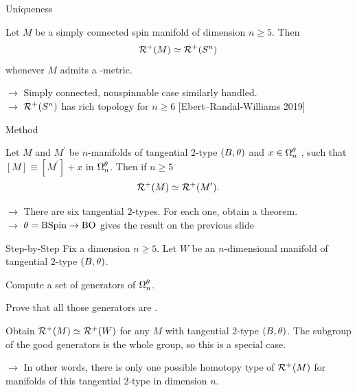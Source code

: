 \documentclass{presis}
\begin{document}
\begin{frame}{Uniqueness}
    \begin{thm}
        Let $M$ be a simply connected spin manifold of dimension $n\geq 5$. Then
        \begin{equation*}
            \mathcal{R}^+(M) \simeq \mathcal{R}^+(S^n)
        \end{equation*}
        whenever $M$ admits a \psc-metric.
    \end{thm}\pause
    $\rightarrow$ Simply connected, nonspinnable case similarly handled.\\\pause
    $\rightarrow$ $\mathcal{R}^+(S^n)$ has rich topology for $n\geq 6$ [Ebert--Randal-Williams 2019]
\end{frame}

\begin{frame}{Method}
    \begin{thm}
        Let $M$ and $M^\prime$ be $n$-manifolds of tangential $2$-type $(B,\theta)$ and $x\in \Omega_n^\theta$ \good, such that $[M] \equiv [M^\prime] + x$ in $\Omega_n^\theta$.
    Then if $n\geq 5$
    \begin{equation*}
        \mathcal{R}^+(M) \simeq \mathcal{R}^+(M^\prime).
    \end{equation*}
    \end{thm}\pause
    $\rightarrow$ There are six tangential $2$-types. For each one, obtain a theorem.\\\pause
    $\rightarrow$ $\theta=\mathrm{BSpin}\to\mathrm{BO}$ gives the result on the previous slide
\end{frame}

\begin{frame}{Step-by-Step}
    Fix a dimension $n\geq5$. Let $W$ be an $n$-dimensional manifold of tangential $2$-type $(B,\theta)$.\pause
    \begin{vfilleditems}
    \item[\protect\circled{1}] Compute a set of generators of $\Omega_n^\theta$.\pause
    \item[\protect\circled{2}] Prove that all those generators are \good.{}\pause
    \item[\protect\circled{3}] Obtain $\mathcal{R}^+(M) \simeq \mathcal{R}^+(W)$ for any $M$ with tangential $2$-type $(B,\theta)$.
        {\color{black} The subgroup of the good generators is the whole group, so this is a special case.} %
    \end{vfilleditems}\pause
    $\rightarrow$ In other words, there is only one possible homotopy type of $\mathcal{R}^+(M)$ for manifolds of this tangential $2$-type in dimension $n$.
\end{frame}
\end{document}
